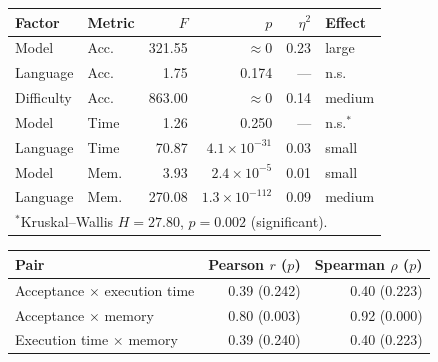 \begin{tabular}{llrrrl}
\hline
\textbf{Factor} & \textbf{Metric} & \textbf{$F$} & \textbf{$p$} & \textbf{$\eta^{2}$} & \textbf{Effect} \\
\hline
Model & Acc. & 321.55 & $\approx0$ & 0.23 & large \\
Language & Acc. & 1.75 & 0.174 & --- & n.s. \\
Difficulty & Acc. & 863.00 & $\approx0$ & 0.14 & medium \\
Model & Time & 1.26 & 0.250 & --- & n.s.$^{*}$ \\
Language & Time & 70.87 & $4.1\times10^{-31}$ & 0.03 & small \\
Model & Mem. & 3.93 & $2.4\times10^{-5}$ & 0.01 & small \\
Language & Mem. & 270.08 & $1.3\times10^{-112}$ & 0.09 & medium \\
\hline
\multicolumn{6}{l}{\footnotesize $^{*}$Kruskal--Wallis $H=27.80$, $p=0.002$ (significant).}
\end{tabular}

\begin{tabular}{lrr}
\hline
\textbf{Pair} & \textbf{Pearson $r$ ($p$)} & \textbf{Spearman $\rho$ ($p$)} \\
\hline
Acceptance $\times$ execution time & 0.39 (0.242) & 0.40 (0.223) \\
Acceptance $\times$ memory & 0.80 (0.003) & 0.92 (0.000) \\
Execution time $\times$ memory & 0.39 (0.240) & 0.40 (0.223) \\
\hline
\end{tabular}


